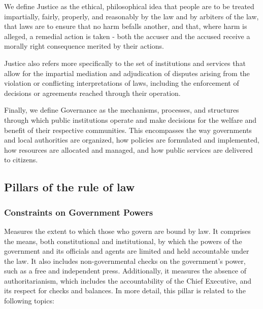\documentclass[
]{agujournal2019}
\begin{document}
We define Justice as the ethical, philosophical idea that people are to
be treated impartially, fairly, properly, and reasonably by the law and
by arbiters of the law, that laws are to ensure that no harm befalls
another, and that, where harm is alleged, a remedial action is taken -
both the accuser and the accused receive a morally right consequence
merited by their actions.

Justice also refers more specifically to the set of institutions and
services that allow for the impartial mediation and adjudication of
disputes arising from the violation or conflicting interpretations of
laws, including the enforcement of decisions or agreements reached
through their operation.

Finally, we define Governance as the mechanisms, processes, and
structures through which public institutions operate and make decisions
for the welfare and benefit of their respective communities. This
encompasses the way governments and local authorities are organized, how
policies are formulated and implemented, how resources are allocated and
managed, and how public services are delivered to citizens.

\subsection{Pillars of the rule of
law}\label{pillars-of-the-rule-of-law}

\subsubsection{Constraints on Government
Powers}\label{constraints-on-government-powers}

Measures the extent to which those who govern are bound by law. It
comprises the means, both constitutional and institutional, by which the
powers of the government and its officials and agents are limited and
held accountable under the law. It also includes non-governmental checks
on the government's power, such as a free and independent press.
Additionally, it measures the absence of authoritarianism, which
includes the accountability of the Chief Executive, and its respect for
checks and balances. In more detail, this pillar is related to the
following topics:
\end{document}
